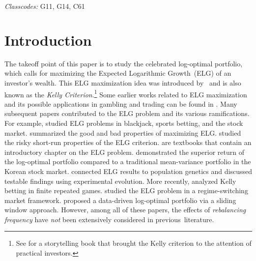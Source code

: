 \documentclass[10pt]{article} %
\begin{document}
		\vspace{5mm}
\textit{Classcodes:} G11, G14, C61
	
	
	
	\section{Introduction}\label{section: introduction}
	The takeoff point of this paper is to study the celebrated log-optimal portfolio, which calls for maximizing the Expected Logarithmic Growth~(ELG) of an investor's wealth.
	This ELG maximization idea was introduced by~\cite{Kelly_1956} and is also known as the \textit{Kelly Criterion}.\footnote{See \cite{poundstone2010fortune} for a storytelling book that brought the Kelly criterion to the attention of practical investors.}   
	Some earlier works related to ELG maximization and its possible applications in gambling and trading can be found in \cite{breiman1961optimal,thorp1975portfolio, cover1984algorithm, algoet1988asymptotic, rotando1992kelly, browne1996portfolio}.
	Many subsequent papers contributed to the ELG problem and its various ramifications.
	For example, \cite{thorp2006kelly} studied ELG problems in blackjack, sports betting, and the stock market.
	\cite{maclean2010long, maclean2011does} summarized the good and bad properties of maximizing ELG.
	\cite{maclean2016optimal} studied the risky short-run properties of the ELG criterion.
	\cite{cover2006elements, luenberger2013investment} are textbooks that contain an introductory chapter on the ELG problem.
	\cite{kim2017comparison} demonstrated the superior return of the log-optimal portfolio compared to a traditional mean-variance portfolio in the Korean stock market.
	\cite{lo2018growth} connected ELG results to population genetics and discussed testable findings using experimental evolution.
	More recently, \cite{wu2020analysis} analyzed  Kelly betting in finite repeated games.
	\cite{maclean2022kelly} studied the ELG problem in a regime-switching market framework.
	\cite{wang2022data} proposed a data-driven log-optimal portfolio via a sliding window approach.
	However, among all of these papers, the effects of \textit{rebalancing frequency} have \textit{not} been extensively considered in previous~literature. 
	
	
	
\end{document}
